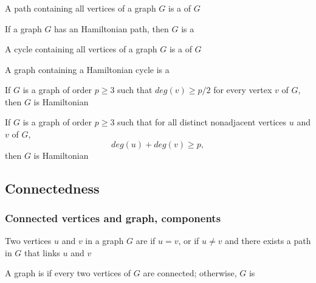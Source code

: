 \documentclass[aspectratio=43]{beamer}
\begin{document}
\begin{frame}\frametitle{}
\begin{definition}
	A path containing all vertices of a graph $G$ is a  of $G$
\end{definition}
\vfill
\begin{definition}
	If a graph $G$ has an Hamiltonian path, then $G$ is a 
\end{definition}
\vfill
\begin{definition}
	A cycle containing all vertices of a graph $G$ is a  of $G$
\end{definition}
\vfill
\begin{definition}
	A graph containing a Hamiltonian cycle is a 
\end{definition}
\end{frame}

\begin{frame}
\begin{theorem}
	If $G$ is a graph of order $p\geq 3$ such that $deg(v)\geq p/2$ for every vertex $v$ of $G$, then $G$ is Hamiltonian
\end{theorem}
\vfill
\begin{theorem}
	If $G$ is a graph of order $p\geq 3$ such that for all distinct nonadjacent vertices $u$ and $v$ of $G$, $$deg(u)+deg(v)\geq p,$$ 
	then $G$ is Hamiltonian
\end{theorem}
\end{frame}


\subsection{Connectedness}

\begin{frame}\frametitle{Connected vertices and graph, components}
\begin{definition}
Two vertices $u$ and $v$ in a graph $G$ are  if $u=v$, or if $u\not =v$ and there exists a path in $G$ that links $u$ and $v$
\end{definition}
\vfill
\begin{definition}
A graph is  if every two vertices of $G$ are connected; otherwise, $G$ is 
\end{definition}
\end{frame}
\end{document}
